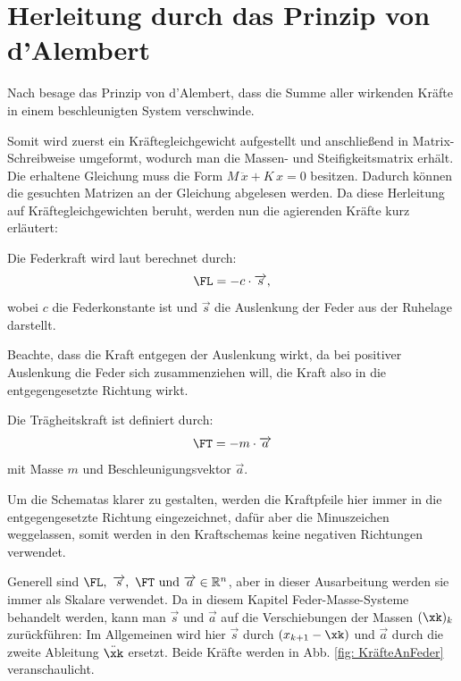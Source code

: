 \documentclass[ngerman,BCOR=4mm]{tudscrreprt}
\newcommand{\R}{\mathbb R}
\theoremstyle{plain} %
\theoremstyle{definition} %
\theoremstyle{remark}
\begin{document}
      \section{Herleitung durch das Prinzip von d'Alembert}
            Nach \cite{d_AlembertPrinzip} besage das Prinzip von d'Alembert, dass die Summe aller wirkenden Kräfte in einem beschleunigten System verschwinde.

            Somit wird zuerst ein Kräftegleichgewicht aufgestellt und anschließend in Matrix-Schreibweise umgeformt, wodurch man die Massen- und Steifigkeitsmatrix erhält.
            Die erhaltene Gleichung muss die Form $M\,\ddot x+K\,x = 0$ besitzen. Dadurch können die gesuchten Matrizen an der Gleichung abgelesen werden.
            Da diese Herleitung auf Kräftegleichgewichten beruht, werden nun die agierenden Kräfte kurz erläutert:

            Die Federkraft \FL wird laut \cite{federkraft} berechnet durch:
            \begin{equation}
                  \label{eqn: Federkraft}
                  \FL = -c\cdot \overrightarrow s,
            \end{equation}
            wobei $c$ die Federkonstante ist und $\overrightarrow s$ die Auslenkung der Feder aus der Ruhelage darstellt.

            Beachte, dass die Kraft entgegen der Auslenkung wirkt, da bei positiver Auslenkung die Feder sich zusammenziehen will, die Kraft also in die entgegengesetzte Richtung wirkt.
                  
            Die Trägheitskraft \FT ist definiert durch:
            \begin{equation}
                  \label{eqn: Trägheitskraft}
                  \FT = -m\cdot \overrightarrow{a}
            \end{equation}
            mit Masse $m$ und Beschleunigungsvektor $\overrightarrow{a}$.                  

            Um die Schematas klarer zu gestalten, werden die Kraftpfeile hier immer in die entgegengesetzte Richtung eingezeichnet, dafür aber die Minuszeichen weggelassen,
            somit werden in den Kraftschemas keine negativen Richtungen verwendet.

            Generell sind $\FL,\ \overrightarrow{s},\ \FT \text{ und } \overrightarrow{a}\in \R^n$, aber in dieser Ausarbeitung werden sie immer als Skalare verwendet. 
            Da in diesem Kapitel Feder-Masse-Systeme behandelt werden, kann man $\overrightarrow{s}$ und $\overrightarrow{a}$ auf die Verschiebungen der Massen $(\xk)_k$ zurückführen:
            Im Allgemeinen wird hier $\overrightarrow{s}$ durch $(x_{k+1}-\xk)$ und $\overrightarrow{a}$ durch die zweite Ableitung $\ddot \xk$ ersetzt.
            Beide Kräfte werden in Abb. \ref{fig: KräfteAnFeder} veranschaulicht.
\end{document}
